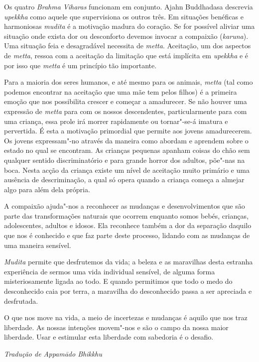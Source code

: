 Os quatro \emph{Brahma Viharas} funcionam em conjunto. Ajahn Buddhadasa
descrevia \emph{upekkha} como aquele que supervisiona os outros três. Em
situações benéficas e harmoniosas \emph{mudita} é a motivação madura do
coração. Se for possível aliviar uma situação onde exista dor ou
desconforto devemos invocar a compaixão (\emph{karuna}). Uma situação
feia e desagradável necessita de \emph{metta}. Aceitação, um dos
aspectos de \emph{metta}, ressoa com a aceitação da limitação que está
implícita em \emph{upekkha} e é por isso que \emph{metta} é um princípio
tão importante.

Para a maioria dos seres humanos, e até mesmo para os animais,
\emph{metta} (tal como podemos encontrar na aceitação que uma mãe tem
pelos filhos) é a primeira emoção que nos possibilita crescer e começar
a amadurecer. Se não houver uma expressão de \emph{metta} para com os
nossos descendentes, particularmente para com uma criança, essa prole
irá morrer rapidamente ou tornar"-se-á imatura e pervertida. É esta a
motivação primordial que permite aos jovens amadurecerem. Os jovens
expressam"-no através da maneira como abordam e aprendem sobre o estado
no qual se encontram. As crianças pequenas apanham coisas do chão sem
qualquer sentido discriminatório e para grande horror dos adultos,
põe"-nas na boca. Nesta acção da criança existe um nível de aceitação
muito primário e uma ausência de descriminação, a qual só opera quando a
criança começa a almejar algo para além dela própria.

A compaixão ajuda"-nos a reconhecer as mudanças e desenvolvimentos que
são parte das transformações naturais que ocorrem enquanto somos bebés,
crianças, adolescentes, adultos e idosos. Ela reconhece também a dor da
separação daquilo que nos é conhecido e que faz parte deste processo,
lidando com as mudanças de uma maneira sensível.

\emph{Mudita} permite que desfrutemos da vida; a beleza e as maravilhas
desta estranha experiência de sermos uma vida individual sensível, de
alguma forma misteriosamente ligada ao todo. E quando permitimos que
todo o medo do desconhecido caia por terra, a maravilha do desconhecido
passa a ser apreciada e desfrutada.

O que nos move na vida, a meio de incertezas e mudanças é aquilo que nos
traz liberdade. As nossas intenções movem"-nos e são o campo da nossa
maior liberdade. Usar e estimular esta liberdade com sabedoria é o
desafio.

\bigskip

{\raggedleft\itshape
  Tradução de Appamādo Bhikkhu
\par}